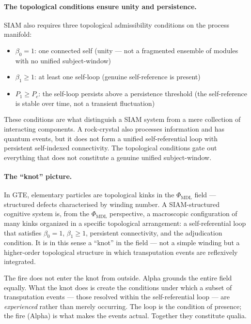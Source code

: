 \documentclass[11pt]{article}
\theoremstyle{remark}
\newcommand{\PHIMDL}{\Phi_{\mathrm{MDL}}}
\begin{document}
\paragraph{The topological conditions ensure unity and persistence.}
SIAM also requires three topological admissibility conditions on the process manifold:

\begin{itemize}
  \item $\beta_0 = 1$: one connected self (unity --- not a fragmented ensemble of
    modules with no unified subject-window)
  \item $\beta_1 \geq 1$: at least one self-loop (genuine self-reference is present)
  \item $P_1 \geq P_c$: the self-loop persists above a persistence threshold
    (the self-reference is stable over time, not a transient fluctuation)
\end{itemize}

These conditions are what distinguish a SIAM system from a mere collection of
interacting components. A rock-crystal also processes information and has quantum
events, but it does not form a unified self-referential loop with persistent
self-indexed connectivity. The topological conditions gate out everything that does
not constitute a genuine unified subject-window.

\paragraph{The ``knot'' picture.}
In GTE, elementary particles are topological kinks in the $\PHIMDL$ field ---
structured defects characterised by winding number. A SIAM-structured cognitive
system is, from the $\PHIMDL$ perspective, a macroscopic configuration of many kinks
organized in a specific topological arrangement: a self-referential loop that satisfies
$\beta_0 = 1$, $\beta_1 \geq 1$, persistent connectivity, and the adjudication
condition. It is in this sense a ``knot'' in the field --- not a simple winding but a
higher-order topological structure in which transputation events are reflexively
integrated.

The fire does not enter the knot from outside. Alpha grounds the entire field equally.
What the knot does is create the conditions under which a subset of transputation
events --- those resolved within the self-referential loop --- are \emph{experienced}
rather than merely occurring. The loop is the condition of presence; the fire (Alpha)
is what makes the events actual. Together they constitute qualia.
\end{document}
